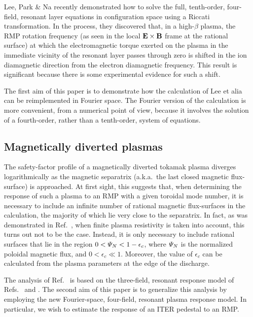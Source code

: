 \documentclass[12pt,prb,aps]{revtex4-1}
\begin{document}
 Lee, Park \& Na\cite{lee} recently demonstrated  how to solve the full, tenth-order, four-field,  resonant layer equations in configuration space using a Riccati transformation. In the process, they discovered that, in a high-$\beta$ plasma,  the RMP rotation frequency (as seen in the local ${\bf E}\times {\bf B}$ frame
 at the rational surface)  at which the electromagnetic torque exerted on the plasma in the immediate vicinity of the resonant layer passes through zero is shifted in the ion diamagnetic direction from the electron diamagnetic frequency.
 This result is significant because there is some experimental evidence for such a shift.\cite{textor1,textor2,paz} 
 
 The first aim of this paper is to demonstrate how the calculation of
 Lee et alia can be reimplemented in Fourier space. The Fourier version of the calculation is more convenient, from a numerical point of view, because
 it involves the solution of a fourth-order, rather than a tenth-order, system of equations. 
 
 \subsection{Magnetically diverted plasmas}
 The safety-factor profile of a magnetically diverted tokamak plasma diverges logarithmically as the magnetic separatrix 
(a.k.a.\ the last closed magnetic flux-surface) is approached. At first sight, this suggests that, when determining the response of such a plasma to an RMP 
with a given toroidal mode number, it is necessary to include an infinite number of rational magnetic flux-surfaces in the calculation, the
majority of which lie  very close to the separatrix. In fact, as was demonstrated in Ref.~, when finite plasma resistivity is taken into account, this turns out not to be the case. 
Instead, it is only necessary to include rational surfaces that
lie in the region $0<{\mit\Psi}_N<1-\epsilon_c$, where ${\mit\Psi}_N$ is the normalized poloidal magnetic flux, and
$0<\epsilon_c\ll 1$. Moreover, the value of $\epsilon_c$ can be calculated from the plasma parameters at the edge of the discharge. 

The analysis of Ref.~ is based on the three-field, resonant response model of Refs.~ and .
The second aim of this paper is to generalize this analysis  by employing  the new Fourier-space, four-field, resonant plasma response model. In particular, we wish to estimate the response of
an ITER pedestal to an RMP. 
\end{document}
